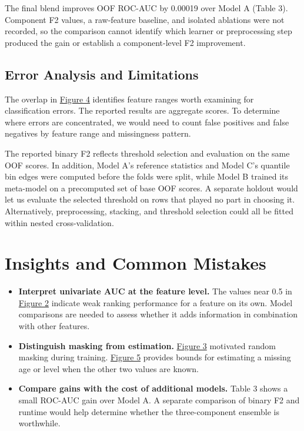\documentclass[11pt,a4paper]{article}
\newcommand{\reserveheading}[1]{\par\ifdim\dimexpr\pagegoal-\pagetotal\relax<#1\relax\newpage\fi}
\begin{document}
The final blend improves OOF ROC-AUC by 0.00019 over Model A (Table 3). Component F2 values, a raw-feature baseline, and isolated ablations were not recorded, so the comparison cannot identify which learner or preprocessing step produced the gain or establish a component-level F2 improvement.

\subsection{Error Analysis and Limitations}

The overlap in \hyperlink{task1-figure-4}{Figure 4} identifies feature ranges worth examining for classification errors. The reported results are aggregate scores. To determine where errors are concentrated, we would need to count false positives and false negatives by feature range and missingness pattern.

The reported binary F2 reflects threshold selection and evaluation on the same OOF scores. In addition, Model A's reference statistics and Model C's quantile bin edges were computed before the folds were split, while Model B trained its meta-model on a precomputed set of base OOF scores. A separate holdout would let us evaluate the selected threshold on rows that played no part in choosing it. Alternatively, preprocessing, stacking, and threshold selection could all be fitted within nested cross-validation.

\reserveheading{13\baselineskip}
\section{Insights and Common Mistakes}

\begin{itemize}
\item \textbf{Interpret univariate AUC at the feature level.} The values near 0.5 in \hyperlink{task1-figure-2}{Figure 2} indicate weak ranking performance for a feature on its own. Model comparisons are needed to assess whether it adds information in combination with other features.
\item \textbf{Distinguish masking from estimation.} \hyperlink{task1-figure-3}{Figure 3} motivated random masking during training. \hyperlink{task1-figure-5}{Figure 5} provides bounds for estimating a missing age or level when the other two values are known.
\item \textbf{Compare gains with the cost of additional models.} Table 3 shows a small ROC-AUC gain over Model A. A separate comparison of binary F2 and runtime would help determine whether the three-component ensemble is worthwhile.
\end{itemize}
\end{document}

